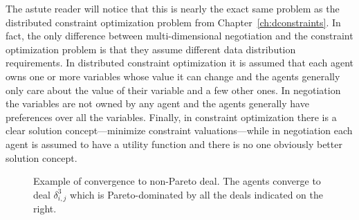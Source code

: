 The astute reader will notice that this is nearly the exact same
problem as the distributed constraint optimization problem from
Chapter~\ref{ch:dconstraints}. In fact, the only difference between
multi-dimensional negotiation and the constraint optimization problem
is that they assume different data distribution requirements. In
distributed constraint optimization it is assumed that each agent owns
one or more variables whose value it can change and the agents
generally only care about the value of their variable and a few other
ones. In negotiation the variables are not owned by any agent and the
agents generally have preferences over all the variables. Finally, in
constraint optimization there is a clear solution concept---minimize
constraint valuations---while in negotiation each agent is assumed to
have a utility function and there is no one obviously better solution
concept.


\begin{SCfigure}
  \begin{minipage}{1.0\linewidth}
    \begin{center}
    \end{center}
  \end{minipage}
  \caption{Example of convergence to non-Pareto deal. The agents
    converge to deal $\delta_{i,j}^3$ which is Pareto-dominated by all
  the deals indicated on the right.}
  \label{fig:non-pareto-conv}
\end{SCfigure}

